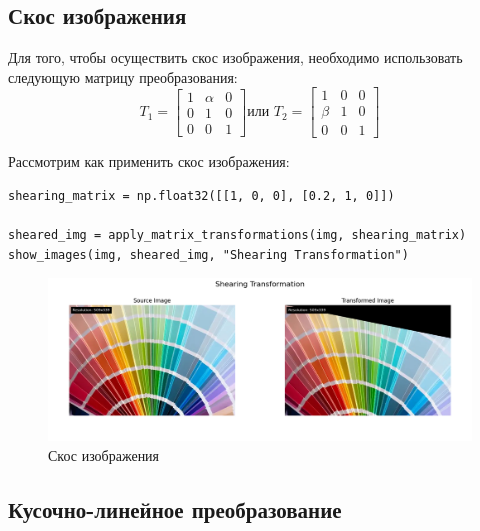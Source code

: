 \subsection{Скос изображения}

Для того, чтобы осуществить скос изображения, необходимо использовать следующую матрицу преобразования:
\begin{equation}
T_1 = \begin{bmatrix}
    1 & \alpha & 0 \\
    0 & 1 & 0 \\
    0 & 0 & 1
\end{bmatrix} \text{или } 
T_2 = \begin{bmatrix}
    1 & 0 & 0 \\
    \beta & 1 & 0 \\
    0 & 0 & 1
\end{bmatrix}
\end{equation}

Рассмотрим как применить скос изображения:
\begin{lstlisting}[style=python_white, caption={Исходный код для скоса изображения}]
shearing_matrix = np.float32([[1, 0, 0], [0.2, 1, 0]])

sheared_img = apply_matrix_transformations(img, shearing_matrix)
show_images(img, sheared_img, "Shearing Transformation")
\end{lstlisting}

\begin{figure}[ht]
    \includegraphics[width=\textwidth]{../results/Shearing Transformation.png}
    \caption{Скос изображения}
    \label{fig:sheared_image}
\end{figure}

\pagebreak
\subsection{Кусочно-линейное преобразование}

